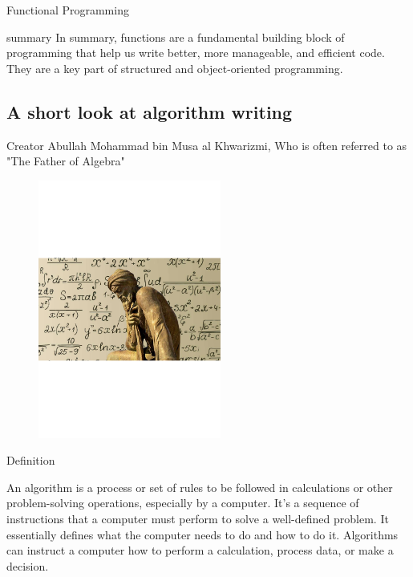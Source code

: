 \documentclass{beamer}\usepackage[]{graphicx}\usepackage[]{xcolor}
\begin{document}
    \begin{frame}{Functional Programming}
    \begin{alertblock}{summary}
        In summary, functions are a fundamental building block of programming that help us write better, more manageable, and efficient code. They are a key part of structured and object-oriented programming.
    \end{alertblock}
    \end{frame}



\subsection{A short look at algorithm writing}
\begin{frame}{Creator}
    \small{Abullah Mohammad bin Musa al Khwarizmi, Who is often referred to as "The Father of Algebra"}
    \begin{figure}[H]
        \centering
        
    \includegraphics[width = 6cm]{kharazmi.pdf}
    
    \end{figure}


\end{frame}
\begin{frame}{Definition}

    \begin{definition}
        An algorithm is a process or set of rules to be followed in calculations or other problem-solving operations, especially by a computer. It's a sequence of instructions that a computer must perform to solve a well-defined problem. It essentially defines what the computer needs to do and how to do it. Algorithms can instruct a computer how to perform a calculation, process data, or make a decision.
    \end{definition}

\end{frame}
\end{document}
